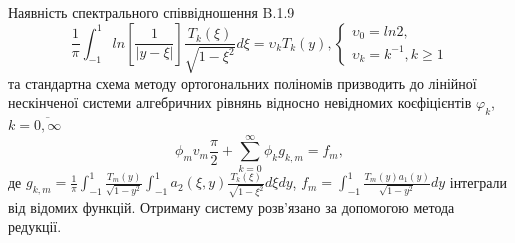 Наявність спектрального співвідношення B.1.9 \cite{ortogonal}
\begin{equation}
    \frac{1}{\pi} \int_{-1}^{1} ln\left[ \frac{1}{\lvert y - \xi \rvert} \right] \frac{T_k(\xi)}{\sqrt{1 - \xi^2}} d\xi = \upsilon_k T_k(y),
    \begin{cases}
        \upsilon_0 = ln 2, \\
        \upsilon_k = k^{-1}, k \ge 1
    \end{cases}
\end{equation} 
та стандартна схема методу ортогональних поліномів призводить до лінійної нескінченої системи алгебричних рівнянь відносно невідномих коєфіцієнтів $\varphi_k$, $k=\overline{0, \infty}$
\begin{equation}\label{int_system_static_2}
    \phi_m v_m \frac{ \pi}{2} + \sum_{k=0}^{\infty} \phi_k g_{k, m} = f_m,
\end{equation}
де $g_{k, m} = \frac{1}{\pi} \int_{-1}^{1} \frac{T_{m}(y)}{\sqrt{1 - y^2}} \int_{-1}^{1} a_2(\xi, y) \frac{T_{k}(\xi)}{\sqrt{1 - \xi^2}} d\xi dy$,
$f_m = \int_{-1}^{1} \frac{T_{m}(y) a_1(y)}{\sqrt{1 - y^2}} dy$ інтеграли від відомих функцій.
Отриману систему розв'язано за допомогою метода редукції.


